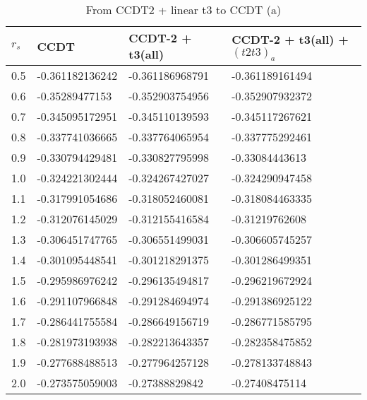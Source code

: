 \begin{table}[hbtp]
\caption{From CCDT2 + linear t3 to CCDT (a)}
\begin{center}
\begin{threeparttable}
\begin{tabular}{l l l l}
    \toprule
$r_s$ & CCDT & CCDT-2 + t3(all) & CCDT-2 + t3(all) + $(t2t3)_a$  \\ \hline
0.5 & -0.361182136242 & -0.361186968791 & -0.361189161494   \\
0.6 & -0.35289477153 & -0.352903754956 & -0.352907932372   \\
0.7 & -0.345095172951 & -0.345110139593 & -0.345117267621   \\
0.8 & -0.337741036665 & -0.337764065954 & -0.337775292461  \\
0.9 & -0.330794429481 & -0.330827795998 & -0.33084443613   \\
1.0 & -0.324221302444 & -0.324267427027 & -0.324290947458   \\
1.1 & -0.317991054686 & -0.318052460081 & -0.318084463335   \\
1.2 & -0.312076145029 & -0.312155416584 & -0.31219762608   \\
1.3 & -0.306451747765 & -0.306551499031 & -0.306605745257   \\
1.4 & -0.301095448541 & -0.301218291375 & -0.301286499351   \\
1.5 & -0.295986976242 & -0.296135494817 & -0.296219672924   \\
1.6 & -0.291107966848 & -0.291284694974 & -0.291386925122   \\
1.7 & -0.286441755584 & -0.286649156719 & -0.286771585795   \\
1.8 & -0.281973193938 & -0.282213643357 & -0.282358475852   \\
1.9 & -0.277688488513 & -0.277964257128 & -0.278133748843   \\
2.0 & -0.273575059003 & -0.27388829842 & -0.27408475114   \\
\bottomrule
\end{tabular}
\begin{tablenotes}
\end{tablenotes}
\end{threeparttable}
\end{center}
\label{tab:ccdt3_to_ccdt_1}
\end{table}

